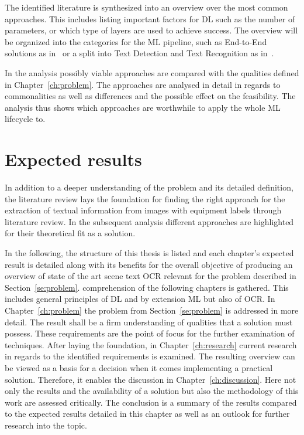 The identified literature is synthesized into an overview over the most common approaches.
This includes listing important factors for \ac{DL} such as the number of parameters, or which
type of layers are used to achieve success.
The overview will be organized into the categories for the \ac{ML} pipeline, such as End-to-End
solutions as in~\cite{xing_convolutional_2019} or a split into Text Detection and Text Recognition
as in~\cite{yang_learning_2021, chen_improvement_2018}.

In the analysis possibly viable approaches are compared with the qualities defined
in Chapter~\ref{ch:problem}.
The approaches are analysed in detail in regards to commonalities as well as differences and the
possible effect on the feasibility.
The analysis thus shows which approaches are worthwhile to apply the whole \ac{ML} lifecycle to.

\section{Expected results}
In addition to a deeper understanding of the problem and its detailed definition, the literature
review lays the foundation for finding the right approach for the extraction of textual
information from images with equipment labels through literature review.
In the subsequent analysis different approaches are highlighted for their theoretical fit as a solution.

In the following, the structure of this thesis is listed and each chapter's expected
result is detailed along with its benefits for the overall objective of producing an overview of
state of the art scene text \ac{OCR} relevant for the problem described in Section~\ref{se:problem}.
comprehension of the following chapters is gathered.
This includes general principles of \ac{DL} and by extension \ac{ML} but also of \ac{OCR}.\@
In Chapter~\ref{ch:problem} the problem from Section~\ref{se:problem} is addressed in more detail.
The result shall be a firm understanding of qualities that a solution must possess.
These requirements are the point of focus for the further examination of techniques.
After laying the foundation, in Chapter~\ref{ch:research} current research in regards to the
identified requirements is examined.
The resulting overview can be viewed as a basis for a decision when it comes implementing a practical
solution.
Therefore, it enables the discussion in Chapter~\ref{ch:discussion}.
Here not only the results and the availability of a solution but also the methodology of this work
are assessed critically.
The conclusion is a summary of the results compared to the expected results detailed in this chapter
as well as an outlook for further research into the topic.
